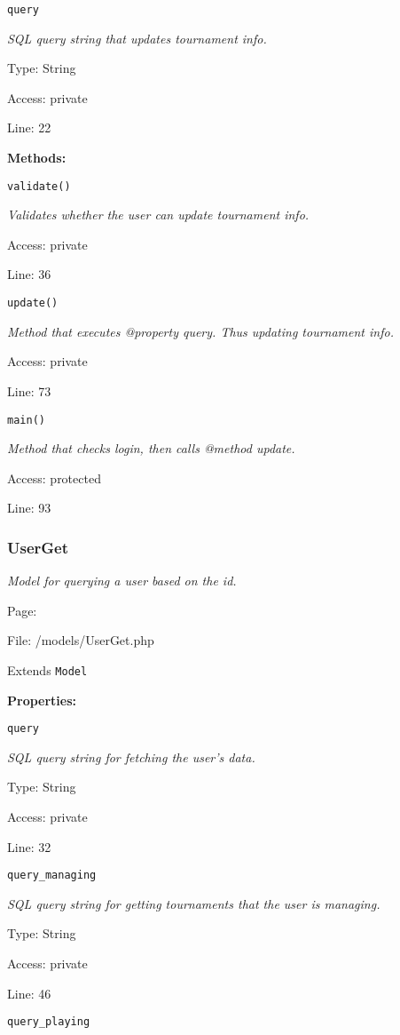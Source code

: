 \texttt{query}

{\scriptsize
\textit{SQL query string that updates tournament info.}

Type: String

Access: private

Line: 22

}
\textbf{Methods:}

\texttt{validate()}

{\scriptsize
\textit{Validates whether the user can update tournament info.}

Access: private

Line: 36

}

\texttt{update()}

{\scriptsize
\textit{Method that executes @property query.
Thus updating tournament info.}

Access: private

Line: 73

}

\texttt{main()}

{\scriptsize
\textit{Method that checks login, then calls @method update.}

Access: protected

Line: 93

}

\subsubsection{UserGet}\label{UserGet.php.doc}
\textit{Model for querying a user based on the id.}

Page: \pageref{UserGet.php}

File: /models/UserGet.php

Extends \texttt{Model}

\textbf{Properties:}

\texttt{query}

{\scriptsize
\textit{SQL query string for fetching the user's data.}

Type: String

Access: private

Line: 32

}
\texttt{query\_managing}

{\scriptsize
\textit{SQL query string for getting tournaments that the user is managing.}

Type: String

Access: private

Line: 46

}
\texttt{query\_playing}


